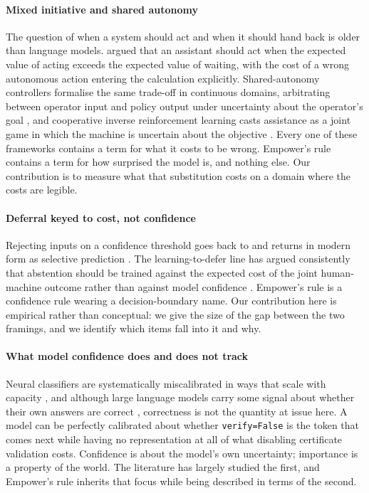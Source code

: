 \documentclass[10pt]{article}
\begin{document}
\paragraph{Mixed initiative and shared autonomy}
The question of when a system should act and when it should hand back is older than language
models. \citet{horvitz1999} argued that an assistant should act when the expected value of acting
exceeds the expected value of waiting, with the cost of a wrong autonomous action entering the
calculation explicitly. Shared-autonomy controllers formalise the same trade-off in continuous
domains, arbitrating between operator input and policy output under uncertainty about the
operator's goal \citep{javdani2015,reddy2018}, and cooperative inverse reinforcement learning casts
assistance as a joint game in which the machine is uncertain about the objective
\citep{hadfieldmenell2016}. Every one of these frameworks contains a term for what it costs to be
wrong. Empower's rule contains a term for how surprised the model is, and nothing else. Our
contribution is to measure what that substitution costs on a domain where the costs are legible.

\paragraph{Deferral keyed to cost, not confidence}
Rejecting inputs on a confidence threshold goes back to \citet{chow1970} and returns in modern form
as selective prediction \citep{geifman2017}. The learning-to-defer line has argued consistently
that abstention should be trained against the expected cost of the joint human-machine outcome
rather than against model confidence \citep{madras2018,mozannar2020,raghu2019,wilder2021}. Empower's
rule is a confidence rule wearing a decision-boundary name. Our contribution here is empirical
rather than conceptual: we give the size of the gap between the two framings, and we identify which
items fall into it and why.

\paragraph{What model confidence does and does not track}
Neural classifiers are systematically miscalibrated in ways that scale with capacity
\citep{guo2017}, and although large language models carry some signal about whether their own
answers are correct \citep{kadavath2022,lin2022,kuhn2023}, correctness is not the quantity at issue
here. A model can be perfectly calibrated about whether \texttt{verify=False} is the token that
comes next while having no representation at all of what disabling certificate validation costs.
Confidence is about the model's own uncertainty; importance is a property of the world. The
literature has largely studied the first, and Empower's rule inherits that focus while being
described in terms of the second.
\end{document}
